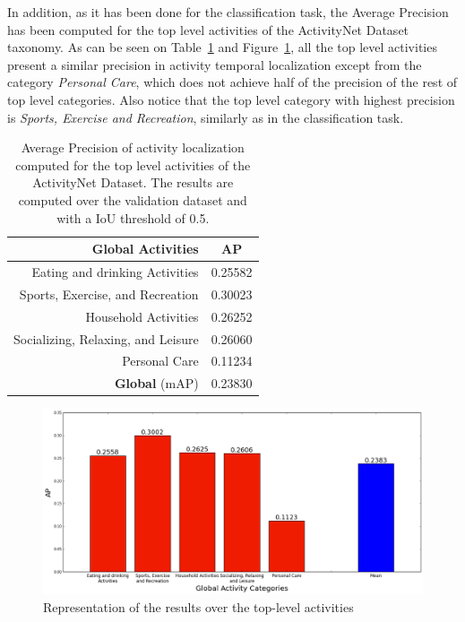 In addition, as it has been done for the classification task, the Average Precision has been computed for the top level activities of the ActivityNet Dataset taxonomy. As can be seen on Table~\ref{table:top_level_detection_ap} and Figure~\ref{fig:top_level_detection_ap}, all the top level activities present a similar precision in activity temporal localization except from the category \textit{Personal Care}, which does not achieve  half of the precision of the rest of top level categories. Also notice that the top level category with highest precision is \textit{Sports, Exercise and Recreation}, similarly as in the classification task.

\begin{table}[H]
\begin{center}
\begin{tabular}{|r|c|}
\hline
\textbf{Global Activities} & \textbf{AP} \\
\hline\hline
Eating and drinking Activities & 0.25582 \\
Sports, Exercise, and Recreation & 0.30023 \\
Household Activities & 0.26252 \\
Socializing, Relaxing, and Leisure & 0.26060 \\
Personal Care & 0.11234 \\
\hline\hline
\textbf{Global} (mAP) & 0.23830 \\
\hline
\end{tabular}
\end{center}
\caption{Average Precision of activity localization computed for the top level activities of the ActivityNet Dataset. The results are computed over the validation dataset and with a IoU threshold of 0.5.}
\label{table:top_level_detection_ap}
\end{table}

\begin{figure}[H]
\begin{center}
\includegraphics[width=1\linewidth]{img/results/top_activities_detection_ap}
\end{center}
\caption{Representation of the results over the top-level activities}
\label{fig:top_level_detection_ap}
\end{figure}


